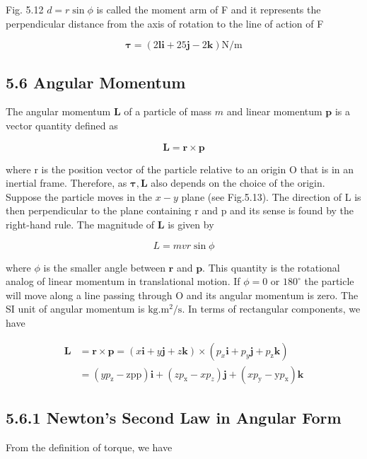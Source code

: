 \documentclass[10pt]{article}
\begin{document}
Fig. 5.12 $d=r \sin \phi$ is called the moment arm of F and it represents the perpendicular distance from the axis of rotation to the line of action of F

$$
\boldsymbol{\tau}=(2 \mathbf{l} \mathbf{i}+25 \mathbf{j}-2 \mathbf{k}) \mathrm{N} / \mathrm{m}
$$

\subsection*{5.6 Angular Momentum}
The angular momentum $\mathbf{L}$ of a particle of mass $m$ and linear momentum $\mathbf{p}$ is a vector quantity defined as

$$
\mathbf{L}=\mathbf{r} \times \mathbf{p}
$$

where r is the position vector of the particle relative to an origin O that is in an inertial frame. Therefore, as $\boldsymbol{\tau}, \mathbf{L}$ also depends on the choice of the origin. Suppose the particle moves in the $x-y$ plane (see Fig.5.13). The direction of L is then perpendicular to the plane containing r and p and its sense is found by the right-hand rule. The magnitude of $\mathbf{L}$ is given by

$$
L=m v r \sin \phi
$$

where $\phi$ is the smaller angle between $\mathbf{r}$ and $\mathbf{p}$. This quantity is the rotational analog of linear momentum in translational motion. If $\phi=0$ or $180^{\circ}$ the particle will move along a line passing through O and its angular momentum is zero. The SI unit of angular momentum is $\mathrm{kg} . \mathrm{m}^{2} / \mathrm{s}$. In terms of rectangular components, we have

$$
\begin{aligned}
\mathbf{L} & =\mathbf{r} \times \mathbf{p}=(x \mathbf{i}+y \mathbf{j}+z \mathbf{k}) \times\left(p_{x} \mathbf{i}+p_{y} \mathbf{j}+p_{\mathrm{z}} \mathbf{k}\right) \\
& =\left(y p_{\mathrm{z}}-\mathrm{zp} \mathrm{p}\right) \mathbf{i}+\left(z p_{\mathrm{x}}-x p_{z}\right) \mathbf{j}+\left(x p_{\mathrm{y}}-\mathrm{y} p_{\mathrm{x}}\right) \mathbf{k}
\end{aligned}
$$

\subsection*{5.6.1 Newton's Second Law in Angular Form}
From the definition of torque, we have
\end{document}

